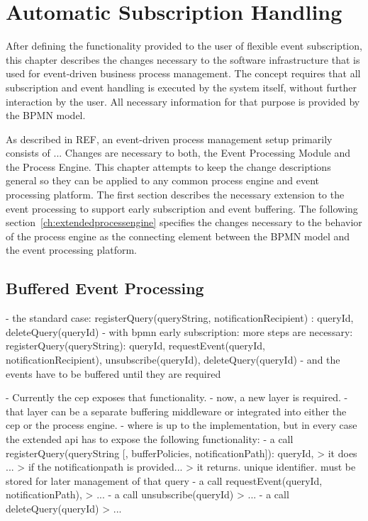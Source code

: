 \chapter{Automatic Subscription Handling}\label{ch:automaticsubscription}

After defining the functionality provided to the user of flexible event subscription, this chapter describes the changes necessary to the software infrastructure that is used for event-driven business process management.
The concept requires that all subscription and event handling is executed by the system itself, without further interaction by the user.
All necessary information for that purpose is provided by the BPMN model.

As described in REF, an event-driven process management setup primarily consists of ...
Changes are necessary to both, the Event Processing Module and the Process Engine. This chapter attempts to keep the change descriptions general so they can be applied to any common process engine and event processing platform.
The first section describes the necessary extension to the event processing to support early subscription and event buffering.
The following section~\autoref{ch:extendedprocessengine} specifies the changes necessary to the behavior of the process engine as the connecting element between the BPMN model and the event processing platform.

\section{Buffered Event Processing}
- the standard case: registerQuery(queryString, notificationRecipient) : queryId, deleteQuery(queryId)
- with bpmn early subscription: more steps are necessary: registerQuery(queryString): queryId, requestEvent(queryId, notificationRecipient), unsubscribe(queryId), deleteQuery(queryId)
- and the events have to be buffered until they are required

- Currently the cep exposes that functionality.
- now, a new layer is required.
- that layer can be a separate buffering middleware or integrated into either the cep or the process engine.
- where is up to the implementation, but in every case the extended api has to expose the following functionality:
- a call registerQuery(queryString [, bufferPolicies, notificationPath]): queryId, 
> it does ...
> if the notificationpath is provided...
> it returns. unique identifier. must be stored for later management of that query
- a call requestEvent(queryId, notificationPath),
> ...
- a call unsubscribe(queryId)
> ...
- a call deleteQuery(queryId)
> ...

